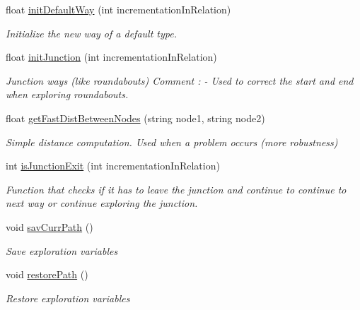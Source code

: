 \begin{DoxyCompactItemize}
float \hyperlink{classCompleteDistBetweenNodes_ad81f518273914101230509348b84504d}{init\+Default\+Way} (int incrementation\+In\+Relation)
\begin{DoxyCompactList}\small\item\em Initialize the new way of a default type. \end{DoxyCompactList}\item 
float \hyperlink{classCompleteDistBetweenNodes_a9061932715a421c475b73f3024cd2586}{init\+Junction} (int incrementation\+In\+Relation)
\begin{DoxyCompactList}\small\item\em Junction ways (like roundabouts) Comment \+: -\/ Used to correct the start and end when exploring roundabouts. \end{DoxyCompactList}\item 
float \hyperlink{classCompleteDistBetweenNodes_ae1123f7d5d32574a944e8250cadda450}{get\+Fast\+Dist\+Between\+Nodes} (string node1, string node2)
\begin{DoxyCompactList}\small\item\em Simple distance computation. Used when a problem occurs (more robustness) \end{DoxyCompactList}\item 
int \hyperlink{classCompleteDistBetweenNodes_adc80b5a016053730e411d703dfbff68f}{is\+Junction\+Exit} (int incrementation\+In\+Relation)
\begin{DoxyCompactList}\small\item\em Function that checks if it has to leave the junction and continue to continue to next way or continue exploring the junction. \end{DoxyCompactList}\item 
void \hyperlink{classCompleteDistBetweenNodes_ae99818fb0ba9602c2025269d8550944d}{sav\+Curr\+Path} ()
\begin{DoxyCompactList}\small\item\em Save exploration variables \end{DoxyCompactList}\item 
void \hyperlink{classCompleteDistBetweenNodes_a137c8c63db5a1a530d97cd4ecfbcf3ee}{restore\+Path} ()
\begin{DoxyCompactList}\small\item\em Restore exploration variables \end{DoxyCompactList}\end{DoxyCompactItemize}
